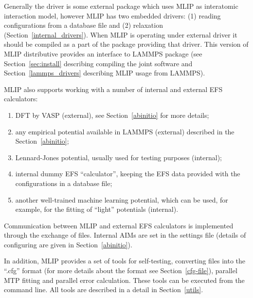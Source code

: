 \documentclass[12pt]{article}
\renewcommand{\_}{\char`_}
\begin{document}

Generally the driver is some external package which uses MLIP as interatomic interaction model, however MLIP has two embedded drivers: (1) reading configurations from a database file and (2) relaxation (Section~\ref{internal_drivers}). When MLIP is operating under external driver it should be compiled as a part of the package providing that driver. This version of MLIP distributive provides an interface to LAMMPS package (see Section~\ref{sec:install} describing compiling the joint software and Section~\ref{lammps_drivers} describing MLIP usage from LAMMPS). 

MLIP also supports working with a number of internal and external EFS calculators:
\begin{enumerate}
	\item DFT by VASP (external), see Section~\ref{abinitio} for more details;
	\item any empirical potential available in LAMMPS (external) described in the Section~\ref{abinitio};
	\item Lennard-Jones potential, usually used for testing purposes (internal);
	\item internal dummy EFS ``calculator'', keeping the EFS data provided with the configurations in a database file;
	\item another well-trained machine learning potential, which can be used, for example, for the fitting of ``light'' potentials (internal).
\end{enumerate}
Communication between MLIP and external EFS calculators is implemented through the exchange of files. Internal AIMs are set in the settings file (details of configuring are given in Section~\ref{abinitio}).

In addition, MLIP provides a set of tools for self-testing, converting files into the ``.cfg'' format (for more details about the format see Section~\ref{cfg-file}), parallel MTP fitting and parallel error calculation. These tools can be executed from the command line. All tools are described in a detail in Section~\ref{utils}.
\end{document}
